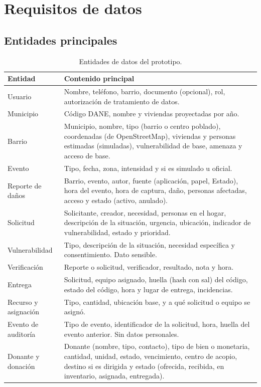 \section{Requisitos de datos}

\subsection{Entidades principales}
\begin{table}[H]
\centering
\caption{Entidades de datos del prototipo.}
\begin{tabularx}{\textwidth}{@{}p{3.2cm}X@{}}
\toprule
\textbf{Entidad} & \textbf{Contenido principal} \\
\midrule
Usuario & Nombre, teléfono, barrio, documento (opcional), rol, autorización de tratamiento de datos. \\
Municipio & Código DANE, nombre y viviendas proyectadas por año. \\
Barrio & Municipio, nombre, tipo (barrio o centro poblado), coordenadas (de OpenStreetMap), viviendas y personas estimadas (simuladas), vulnerabilidad de base, amenaza y acceso de base. \\
Evento & Tipo, fecha, zona, intensidad y si es simulado u oficial. \\
Reporte de daños & Barrio, evento, autor, fuente (aplicación, papel, Estado), hora del evento, hora de captura, daño, personas afectadas, acceso y estado (activo, anulado). \\
Solicitud & Solicitante, creador, necesidad, personas en el hogar, descripción de la situación, urgencia, ubicación, indicador de vulnerabilidad, estado y prioridad. \\
Vulnerabilidad & Tipo, descripción de la situación, necesidad específica y consentimiento. Dato sensible. \\
Verificación & Reporte o solicitud, verificador, resultado, nota y hora. \\
Entrega & Solicitud, equipo asignado, huella (hash con sal) del código, estado del código, hora y lugar de entrega, incidencias. \\
Recurso y asignación & Tipo, cantidad, ubicación base, y a qué solicitud o equipo se asignó. \\
Evento de auditoría & Tipo de evento, identificador de la solicitud, hora, huella del evento anterior. Sin datos personales. \\
Donante y donación & Donante (nombre, tipo, contacto), tipo de bien o monetaria, cantidad, unidad, estado, vencimiento, centro de acopio, destino si es dirigida y estado (ofrecida, recibida, en inventario, asignada, entregada). \\

\end{tabularx}
\end{table}
